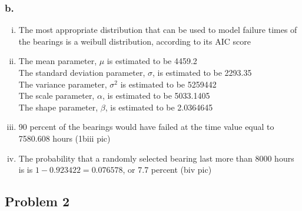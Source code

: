 \documentclass[14pt]{article}
\begin{document}
\subsubsection*{b.}
\begin{enumerate}[(i)]

\item
The most appropriate distribution that can be used to model failure times of the bearings is a weibull distribution, according to its AIC score

\item
The mean parameter, $\mu$ is estimated to be 4459.2 \\
The standard deviation parameter, $\sigma$, is estimated to be 2293.35 \\
The variance parameter, $\sigma^2$ is estimated to be 5259442 \\
The scale parameter, $\alpha$, is estimated to be 5033.1405 \\
The shape parameter, $\beta$, is estimated to be 2.0364645

\item
90 percent of the bearings would have failed at the time value equal to 7580.608 hours (1biii pic)

\item
The probability that a randomly selected bearing last more than 8000 hours is is $1 - 0.923422 = 0.076578$, or 7.7 percent (biv pic)

\end{enumerate}


\subsection*{Problem 2}
\end{document}
